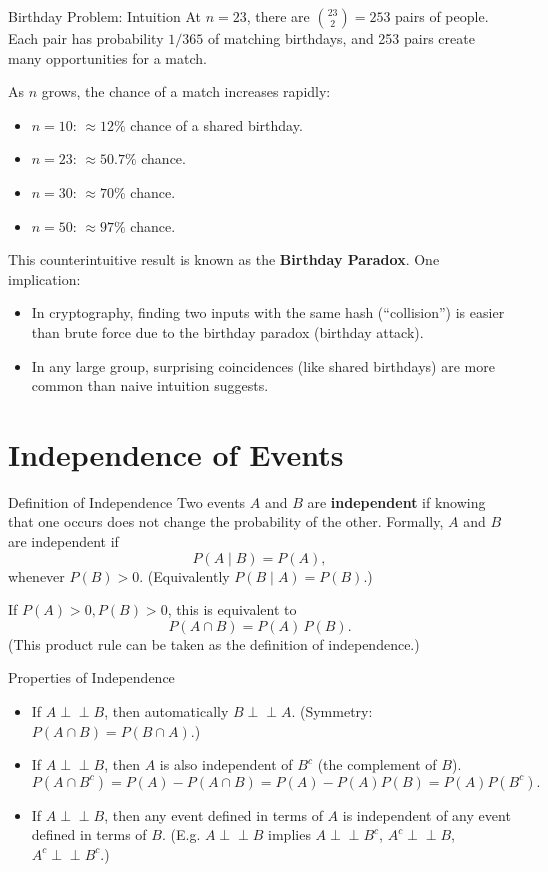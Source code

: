 \documentclass[aspectratio=169,11pt]{beamer} %
\newcommand{\indep}{\perp\!\!\!\perp} %
\begin{document}
\begin{frame}[fragile]{Birthday Problem: Intuition}
At $n=23$, there are $\binom{23}{2} = 253$ pairs of people. Each pair has probability $1/365$ of matching birthdays, and 253 pairs create many opportunities for a match. \newline

As $n$ grows, the chance of a match increases rapidly:
\begin{itemize}
    \item $n=10$: $\approx 12\%$ chance of a shared birthday. 
    \item $n=23$: $\approx 50.7\%$ chance.
    \item $n=30$: $\approx 70\%$ chance.
    \item $n=50$: $\approx 97\%$ chance.
\end{itemize}

This counterintuitive result is known as the \textbf{Birthday Paradox}. One implication:
\begin{itemize}
    \item In cryptography, finding two inputs with the same hash (``collision'') is easier than brute force due to the birthday paradox (birthday attack).
    \item In any large group, surprising coincidences (like shared birthdays) are more common than naive intuition suggests.
\end{itemize}
\end{frame}

\section{Independence of Events}

\begin{frame}{Definition of Independence}
Two events $A$ and $B$ are \textbf{independent} if knowing that one occurs does not change the probability of the other. Formally, $A$ and $B$ are independent if 
\[ P(A \mid B) = P(A), \] 
whenever $P(B)>0$. (Equivalently $P(B \mid A) = P(B)$.) \newline

If $P(A)>0, P(B)>0$, this is equivalent to 
\[ P(A \cap B) = P(A)\,P(B). \] 
(This product rule can be taken as the definition of independence.)
\end{frame}

\begin{frame}{Properties of Independence}
\begin{itemize}
    \item If $A \indep B$, then automatically $B \indep A$. (Symmetry: $P(A \cap B) = P(B \cap A)$.)
    \item If $A \indep B$, then $A$ is also independent of $B^c$ (the complement of $B$). 
    \[P(A \cap B^c) = P(A) - P(A \cap B) = P(A) - P(A)P(B) = P(A)P(B^c).\]
    \item If $A \indep B$, then any event defined in terms of $A$ is independent of any event defined in terms of $B$. (E.g. $A \indep B$ implies $A \indep B^c$, $A^c \indep B$, $A^c \indep B^c$.)
\end{itemize}
\end{frame}
\end{document}
